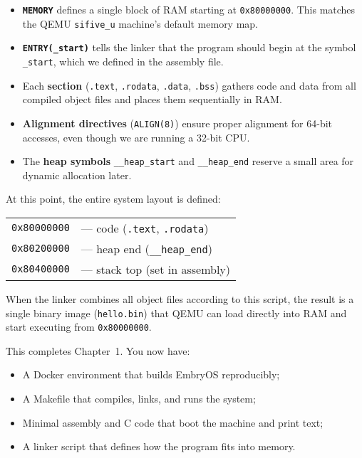 \begin{itemize}
  \item \textbf{\texttt{MEMORY}} defines a single block of RAM starting at
        \texttt{0x80000000}.  This matches the QEMU \texttt{sifive\_u} machine’s
        default memory map.
  \item \textbf{\texttt{ENTRY(\_start)}} tells the linker that the program should
        begin at the symbol \texttt{\_start}, which we defined in the assembly
        file.
  \item Each \textbf{section} (\texttt{.text}, \texttt{.rodata},
        \texttt{.data}, \texttt{.bss}) gathers code and data from all compiled
        object files and places them sequentially in RAM.
  \item \textbf{Alignment directives} (\texttt{ALIGN(8)}) ensure proper
        alignment for 64-bit accesses, even though we are running a 32-bit CPU.
  \item The \textbf{heap symbols} \texttt{\_\_heap\_start} and
        \texttt{\_\_heap\_end} reserve a small area for dynamic allocation later.
\end{itemize}

At this point, the entire system layout is defined:
\begin{center}
\begin{tabular}{ll}
\texttt{0x80000000} & --- code (\texttt{.text}, \texttt{.rodata}) \\
\texttt{0x80200000} & --- heap end (\texttt{\_\_heap\_end}) \\
\texttt{0x80400000} & --- stack top (set in assembly)
\end{tabular}
\end{center}

\medskip
\noindent
When the linker combines all object files according to this script, the result
is a single binary image (\texttt{hello.bin}) that QEMU can load directly into
RAM and start executing from \texttt{0x80000000}.

\bigskip
\noindent
This completes Chapter~1.  You now have:
\begin{itemize}
  \item A Docker environment that builds EmbryOS reproducibly;
  \item A Makefile that compiles, links, and runs the system;
  \item Minimal assembly and C code that boot the machine and print text;
  \item A linker script that defines how the program fits into memory.
\end{itemize}
